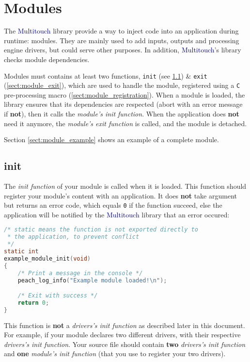 \chapter{Modules}
The \textcolor{darkblue}{Multitouch} library provide a way to inject code into 
an application during runtime: modules. They are mainly used to add inputs,
outputs and processing engine drivers, but could serve other purposes.
In addition, \textcolor{darkblue}{Multitouch}'s library checks module 
dependencies.

Modules must contains at least two functions, \texttt{init} 
(see \ref{sect:module_init}) \& \texttt{exit} (\ref{sect:module_exit}), 
which are used to handle the module, registered using a \texttt{C} 
pre-processing macro (\ref{sect:module_registration}).
When a module is loaded, the library ensures that its dependencies are 
respected (abort with an error message if \textbf{not}), then it calls the 
\textit{module's init function}. When the application does \textbf{not} need 
it anymore, the \textit{module's exit function} is called, and the module 
is detached.

Section \ref{sect:module_example} shows an example of a complete module.

%
%
\section{init}
\label{sect:module_init}
The \textit{init function} of your module is called when it is loaded. This 
function should register your module's content with an application.
It does \textbf{not} take argument but returns an error code, which equals 
\texttt{0} if the function succeed, else the application will be notified by 
the \textcolor{darkblue}{Multitouch} library that an error occured:
\begin{lstlisting}[language=C, caption=Module's init function example]
/* static means the function is not exported directly to
 * the application, to prevent conflict 
 */
static int
example_module_init(void)
{
    /* Print a message in the console */
    peach_log_info("Example module loaded!\n");

    /* Exit with success */
    return 0; 
}
\end{lstlisting}

This function is \textbf{not} a \textit{drivers's init function} as 
described later in this document. For example, if your module declares two
different drivers, with their respective \textit{drivers's init function}.
Your source file should contain \textbf{two} \textit{drivers's init function} 
and \textbf{one} \textit{module's init function} (that you use to register your
two drivers).




